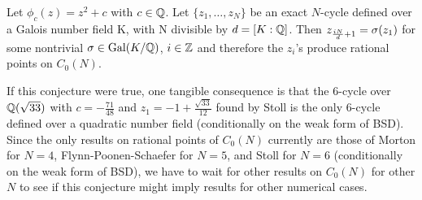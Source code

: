 \begin{conjecture}
  Let $\phi_c(z) = z^2 + c$ with $c \in \mathbb{Q}$. Let $\{z_1, \dots, z_N\}$
  be an exact $N$-cycle defined over a Galois number field K, with N
  divisible by $d = [K:\mathbb{Q} ]$. Then $z_{\frac{iN}{d}+1} = \sigma(z_1)$ for
  some nontrivial $\sigma \in \mathrm{Gal}(K/\mathbb{Q})$, $i \in \mathbb{Z}$ and therefore the
  $z_i$'s produce rational points on $C_0(N)$.
\end{conjecture}

\begin{remark}
  If this conjecture were true, one tangible consequence is that the
  6-cycle over $\mathbb{Q}(\sqrt{33})$ with $c = -\frac{71}{48}$ and $z_1 = -1
  + \frac{\sqrt{33}}{12}$ found by Stoll \cite{MR2465796} is the only
  6-cycle defined over a quadratic number field (conditionally on the
  weak form of BSD). Since the only results on rational points of
  $C_0(N)$ currently are those of Morton \cite{MR1665198} for $N = 4$,
  Flynn-Poonen-Schaefer \cite{MR1480542} for $N = 5$, and Stoll
  \cite{MR2465796} for $N = 6$ (conditionally on the weak form of
  BSD), we have to wait for other results on $C_0(N)$ for other $N$ to
  see if this conjecture might imply results for other numerical
  cases.
\end{remark}


